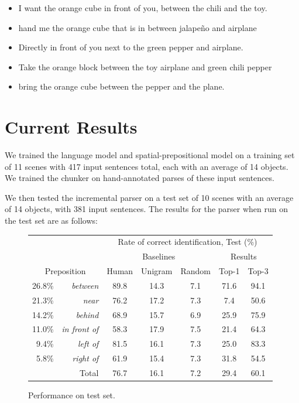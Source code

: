 \documentclass[letterpaper,10pt]{article}
\begin{document}
\begin{itemize}[topsep=0pt,itemsep=-1ex,partopsep=1ex,parsep=1ex]
	\item I want the orange cube in front of you, between the chili and the toy.
	\item hand me the orange cube that is in between jalape\~{n}o and airplane
	\item Directly in front of you next to the green pepper and airplane.
	\item Take the orange block between the toy airplane and green chili pepper
	\item bring the orange cube between the pepper and the plane.
\end{itemize}

\section{Current Results}


We trained the language model and spatial-prepositional model on a training set of 11 scenes with 417 input sentences total, each with an average of 14 objects. We trained the chunker on hand-annotated parses of these input sentences.

We then tested the incremental parser on a test set of 10 scenes with an average of 14 objects, with 381 input sentences. The results for the parser when run on the test set are as follows:

\begin{figure}[H]
  \centering
  \begin{tabular}{| r r | c | c | c || c c |} \hline
     & & \multicolumn{5}{c|}{Rate of correct identification, Test (\%)} \\
     & & \multicolumn{3}{c||}{Baselines} & \multicolumn{2}{c|}{Results} \\
     \multicolumn{2}{|c|}{Preposition}
			                      &   Human & Unigram & Random &  Top-1 & Top-3 \\\hline
26.8\% & \textit{between}       & 89.8  & 14.3   & 7.1   & 71.6  & 94.1 \\
21.3\% & \textit{near}          & 76.2  & 17.2   & 7.3   & 7.4   & 50.6 \\
14.2\% & \textit{behind}        & 68.9  & 15.7   & 6.9   & 25.9  & 75.9 \\
11.0\% & \textit{in front of}   & 58.3  & 17.9   & 7.5   & 21.4  & 64.3 \\
9.4\% & \textit{left of}        & 81.5  & 16.1   & 7.3   & 25.0  & 83.3 \\
5.8\% & \textit{right of}       & 61.9  & 15.4   & 7.3   & 31.8  & 54.5 \\\hline\hline
    \multicolumn{2}{|r|}{Total} & 76.7  & 16.1   & 7.2   & 29.4  & 60.1 \\\hline
  \end{tabular}
  \caption{Performance on test set.}
  \label{fig:results}
\end{figure}
\end{document}
